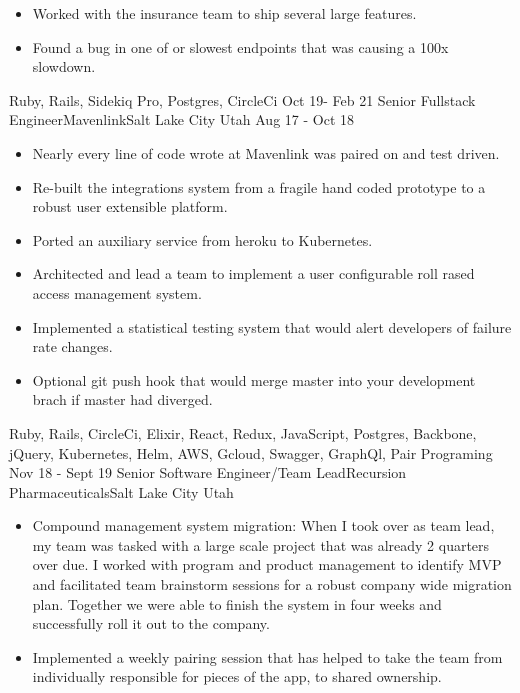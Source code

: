 \begin{experiences}
{\begin{itemize}
          \item Worked with the insurance team to ship several large features.
          \item Found a bug in one of or slowest endpoints that was causing a 100x slowdown.
        \end{itemize}
      }
      {Ruby, Rails, Sidekiq Pro, Postgres, CircleCi}
  \emptySeparator
  \experience
    {Oct 19- Feb 21} {Senior Fullstack Engineer}{Mavenlink}{Salt Lake City Utah}
    {Aug 17 - Oct 18} {
                      \begin{itemize}
                        \item Nearly every line of code wrote at Mavenlink was paired on and test driven.
                        \item Re-built the integrations system from a fragile hand coded prototype to a robust user extensible platform.
                        \item Ported an auxiliary service from heroku to Kubernetes.
                        \item Architected and lead a team to implement a user configurable roll rased access management system. 
                        \item Implemented a statistical testing system that would alert developers of failure rate changes.
                        \item Optional git push hook that would merge master into your development brach if master had diverged.
                      \end{itemize}
                    }
                    {Ruby, Rails, CircleCi, Elixir, React, Redux, JavaScript, Postgres, Backbone, jQuery, Kubernetes, Helm, AWS, Gcloud, Swagger, GraphQl, Pair Programing}
  \emptySeparator
  \experience
    {Nov 18 - Sept 19} {Senior Software Engineer/Team Lead}{Recursion Pharmaceuticals}{Salt Lake City Utah}
    {}    {
                      \begin{itemize}
                        \item Compound management system migration:
                        When I took over as team lead, my team was tasked with a large scale project that was already 2 quarters over due. I worked with program and product management to identify MVP and facilitated team brainstorm sessions for a robust company wide migration plan. Together we were able to finish the system in four weeks and successfully roll it out to the company.
                        \item Implemented a weekly pairing session that has helped to take the team from individually responsible for pieces of the app, to shared ownership.

\end{itemize}}
\end{experiences}
